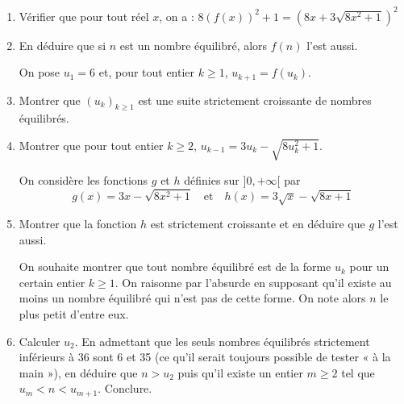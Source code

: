 \begin{enumerate}
    \item Vérifier que pour tout réel \( x \), on a : \( 8(f(x))^2 + 1 = (8x + 3\sqrt{8x^2 + 1})^2 \)
    \item En déduire que si \( n \) est un nombre équilibré, alors \( f(n) \) l'est aussi.
    
    On pose \( u_1 = 6 \) et, pour tout entier \( k \geqslant 1 \), \( u_{k+1} = f(u_k) \).
    
    \item Montrer que \( (u_k)_{k \geqslant 1} \) est une suite strictement croissante de nombres équilibrés.
    \item Montrer que pour tout entier \( k \geqslant 2 \), \( u_{k-1} = 3u_k - \sqrt{8u_k^2 + 1} \).
    
    On considère les fonctions \( g \) et \( h \) définies sur \( ]0, +\infty[ \) par
    \[g(x) = 3x - \sqrt{8x^2 + 1} \quad \text{et} \quad h(x) = 3\sqrt{x} - \sqrt{8x + 1}\]
    
    \item Montrer que la fonction \( h \) est strictement croissante et en déduire que \( g \) l'est aussi.
    
    On souhaite montrer que tout nombre équilibré est de la forme \( u_k \) pour un certain entier \( k \geqslant 1 \). On raisonne par l'absurde en supposant qu'il existe au moins un nombre équilibré qui n'est pas de cette forme. On note alors \( n \) le plus petit d'entre eux.
    
    \item Calculer \( u_2 \). En admettant que les seuls nombres équilibrés strictement inférieurs à 36 sont 6 et 35 (ce qu'il serait toujours possible de tester « à la main »), en déduire que \( n > u_2 \) puis qu'il existe un entier \( m \geqslant 2 \) tel que \( u_m < n < u_{m+1} \). Conclure.
\end{enumerate}

